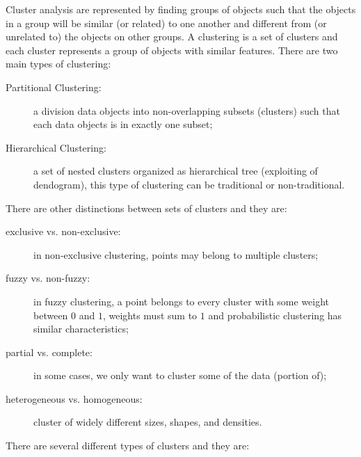 Cluster analysis are represented by finding groups of objects such that the objects in a group will be similar (or related) to one another and different from (or unrelated to) the objects on other groups.
A clustering is a set of clusters and each cluster represents a group of objects with similar features.
There are two main types of clustering:
\begin{description}
	\item[Partitional Clustering:] a division data objects into non-overlapping subsets (clusters) such that each data objects is in exactly one subset;
	\item[Hierarchical Clustering:] a set of nested clusters organized as hierarchical tree (exploiting of dendogram), this type of clustering can be traditional or non-traditional.
\end{description}
There are other distinctions between sets of clusters and they are:
\begin{description}
	\item[exclusive vs. non-exclusive:] in non-exclusive clustering, points may belong to multiple clusters;
	\item[fuzzy vs. non-fuzzy:] in fuzzy clustering, a point belongs to every cluster with some weight between $0$ and $1$, weights must sum to $1$ and probabilistic clustering has similar characteristics;
	\item[partial vs. complete:] in some cases, we only want to cluster some of the data (portion of);
	\item[heterogeneous vs. homogeneous:] cluster of widely different sizes, shapes, and densities.
\end{description}
There are several different types of clusters and they are:
